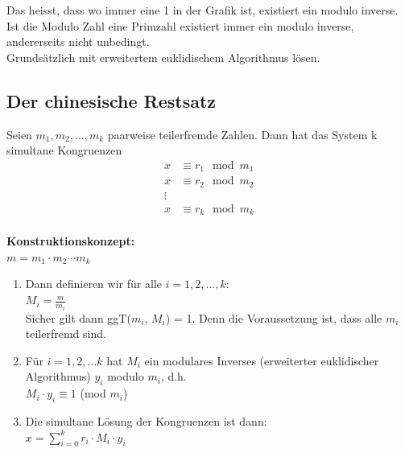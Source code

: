 \documentclass[12pt]{scrartcl}
\begin{document}
Das heisst, dass wo immer eine 1 in der Grafik ist, existiert ein modulo inverse.
Ist die Modulo Zahl eine Primzahl existiert immer ein modulo inverse, andererseits nicht unbedingt.\\

Grundsätzlich mit erweitertem euklidischem Algorithmus lösen.\\


\subsection{Der chinesische Restsatz}
Seien $m_1,m_2, \dots, m_k$ paarweise teilerfremde Zahlen. Dann hat das System k simultane Kongruenzen\\

\begin{align*}
    x &\equiv r_1 \mod m_1 \\
    x &\equiv r_2 \mod m_2 \\
    \vdots \\
    x &\equiv r_k \mod m_k \\
\end{align*}

\textbf{Konstruktionskonzept:}\\
$m = m_1 \cdot m_2 \cdots m_k$
\begin{enumerate}
    \item Dann definieren wir für alle $i = 1,2, \dots, k$:\\
 
    $\displaystyle{M_i = \frac{m}{m_i}}$\\

    Sicher gilt dann ggT($m_i$, $M_i$) = 1. Denn die Voraussetzung ist, dass alle $m_i$ teilerfremd sind.\\
    \item Für $i = 1,2,\dots k$ hat $M_i$ ein modulares Inverses (erweiterter euklidischer Algorithmus)
    $y_i$ modulo $m_i$, d.h.\\

    $\displaystyle{M_i \cdot y_i \equiv 1}$ (mod $m_i$)\\

    \item Die simultane Lösung der Kongruenzen ist dann:\\
    
    $\displaystyle{x = \sum_{i=0}^{k} r_i \cdot M_i \cdot y_i}$\\

\end{enumerate}
\end{document}

